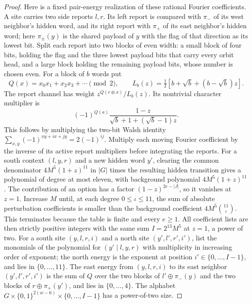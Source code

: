 \begin{proof}
Here is a fixed pair-energy realization of these rational Fourier coefficients. A site carries two side reports \(l,r\). Its left report is compared with \(\pi_-\) of its west neighbor's hidden word, and its right report with \(\pi_+\) of its east neighbor's hidden word; here \(\pi_\pm(y)\) is the shared payload of \(y\) with the flag of that direction as its lowest bit. Split each report into two blocks of even width: a small block of four bits, holding the flag and the three lowest payload bits that carry every orbit head, and a large block holding the remaining payload bits, whose number is chosen even. For a block of \(b\) words put
\[
 Q(x)=x_0x_1+x_2x_3+\cdots\pmod2,\qquad
 L_b(z)=\tfrac12[b+\sqrt b+(b-\sqrt b)z].
\]
The report channel has weight \(z^{Q(r\oplus x)}/L_b(z)\). Its nontrivial character multiplier is
\[
 (-1)^{Q(a)}\frac{1-z}{\sqrt b+1+(\sqrt b-1)z}.
\]
This follows by multiplying the two-bit Walsh identity
\(\sum_{x,y}(-1)^{xy+ix+jy}=2(-1)^{ij}\).
Multiply each moving Fourier coefficient by the inverse of its active report multipliers before integrating the reports. For a south context \((l,y,r)\) and a new hidden word \(y'\), clearing the common denominator \(4M^5(1+z)^{11}\) in \(|G|\) times the resulting hidden transition gives a polynomial of degree at most eleven, with background polynomial \(4M^5(1+z)^{11}\). The contribution of an option has a factor \((1-z)^{2e-|J|}\), so it vanishes at \(z=1\). Increase \(M\) until, at each degree \(0\le\iota\le11\), the sum of absolute perturbation coefficients is smaller than the background coefficient \(4M^5\binom{11}{\iota}\). This terminates because the table is finite and every \(e\ge1\). All coefficient lists are then strictly positive integers with the same sum \(I=2^{13}M^5\) at \(z=1\), a power of two. For a south site \((y,l,r,i)\) and a north site \((y',l',r',i')\), list the monomials of the polynomial for \((y'\mid l,y,r)\) with multiplicity in increasing order of exponent; the north energy is the exponent at position \(i'\in\{0,\ldots,I-1\}\), and lies in \(\{0,\ldots,11\}\). The east energy from \((y,l,r,i)\) to its east neighbor \((y',l',r',i')\) is the sum of \(Q\) over the two blocks of \(l'\oplus\pi_-(y)\) and the two blocks of \(r\oplus\pi_+(y')\), and lies in \(\{0,\ldots,4\}\). The alphabet \(G\times\{0,1\}^{2(w-6)}\times\{0,\ldots,I-1\}\) has a power-of-two size.


\end{proof}
